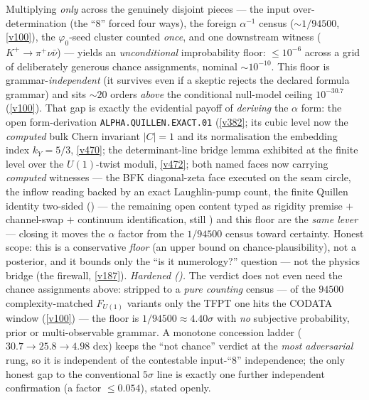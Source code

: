 \documentclass[11pt,a4paper]{article}
\begin{document}
\begin{keybox}
Multiplying \emph{only} across the genuinely disjoint pieces --- the input over-determination (the ``$8$''
forced four ways), the foreign $\alpha^{-1}$ census ($\sim1/94500$, \vref{v100}), the $\varphi_0$-seed cluster
counted \emph{once}, and one downstream witness ($K^+\!\to\!\pi^+\nu\bar\nu$) --- yields an \emph{unconditional}
improbability floor: $\le 10^{-6}$ across a grid of deliberately generous chance assignments, nominal
$\sim 10^{-10}$. This floor is grammar-\emph{independent} (it survives even if a skeptic rejects the declared
formula grammar) and sits $\sim20$ orders \emph{above} the conditional null-model ceiling $10^{-30.7}$
(\vref{v100}). That gap is exactly the evidential payoff of \emph{deriving} the $\alpha$ form: the open
form-derivation \texttt{ALPHA.QUILLEN.EXACT.01} (\vref{v382}; its cubic level now the \emph{computed} bulk Chern
invariant $|C|{=}1$ and its normalisation the embedding index $k_Y{=}5/3$, \vref{v470}; the determinant-line
bridge lemma exhibited at the finite level over the $U(1)$-twist moduli, \vref{v472}; both named faces now
carrying \emph{computed} witnesses --- the BFK diagonal-zeta face executed on the seam circle, the inflow
reading backed by an exact Laughlin-pump count, the finite Quillen identity two-sided
() --- the remaining open content typed as rigidity premise $+$
channel-swap $+$ continuum identification, still \mO) and this
floor are the \emph{same lever} ---
closing it moves the $\alpha$ factor from the $1/94500$ census toward certainty. Honest scope: this is a
conservative \emph{floor} (an upper bound on chance-plausibility), not a posterior, and it bounds only the
``is it numerology?'' question --- not the physics bridge (the firewall, \vref{v187}).
\emph{Hardened ().} The verdict does not even need the chance assignments
above: stripped to a \emph{pure counting} census --- of the $94500$ complexity-matched $F_{U(1)}$ variants
only the TFPT one hits the CODATA window (\vref{v100}) --- the floor is $1/94500\approx4.40\sigma$ with
\emph{no} subjective probability, prior or multi-observable grammar. A monotone concession ladder
($30.7\!\to\!25.8\!\to\!4.98$ dex) keeps the ``not chance'' verdict at the \emph{most adversarial} rung, so
it is independent of the contestable input-``$8$'' independence; the only honest gap to the conventional
$5\sigma$ line is exactly one further independent confirmation (a factor $\le0.054$), stated openly.
\end{keybox}
\end{document}
